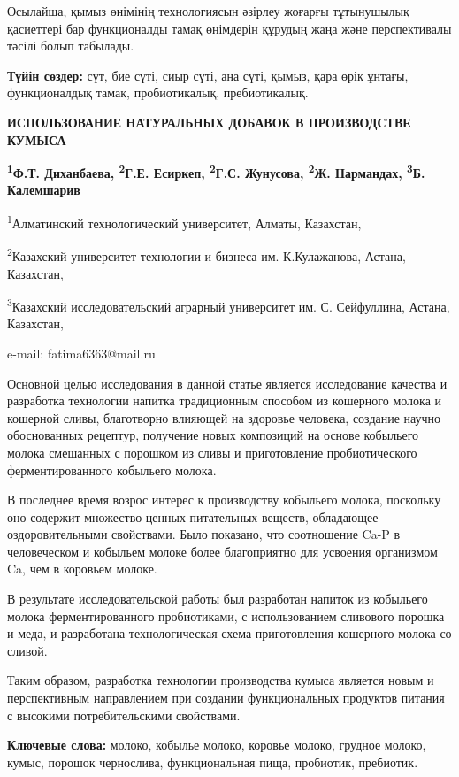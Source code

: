 Осылайша, қымыз өнімінің технологиясын әзірлеу жоғарғы тұтынушылық
қасиеттері бар функционалды тамақ өнімдерін құрудың жаңа және
перспективалы тәсілі болып табылады.

{\bfseries Түйін сөздер:} сүт, бие сүті, сиыр сүті, ана сүті, қымыз, қара
өрік ұнтағы, функционалдық тамақ, пробиотикалық, пребиотикалық.

\begin{center}
{\large\bfseries ИСПОЛЬЗОВАНИЕ НАТУРАЛЬНЫХ ДОБАВОК В ПРОИЗВОДСТВЕ КУМЫСА}

{\bfseries \textsuperscript{1}Ф.Т. Диханбаева, \textsuperscript{2}Г.Е. Есиркеп, \textsuperscript{2}Г.С. Жунусова, \textsuperscript{2}Ж. Нармандах, \textsuperscript{3}Б. Калемшарив}

\textsuperscript{1}Алматинский технологический университет, Алматы,
Казахстан,

\textsuperscript{2}Казахский университет технологии и бизнеса им.
К.Кулажанова, Астана, Казахстан,

\textsuperscript{3}Казахский исследовательский аграрный университет им.
С. Сейфуллина, Астана, Казахстан,

e-mail: fatima6363@mail.ru
\end{center}

Основной целью исследования в данной статье является исследование
качества и разработка технологии напитка традиционным способом из
кошерного молока и кошерной сливы, благотворно влияющей на здоровье
человека, создание научно обоснованных рецептур, получение новых
композиций на основе кобыльего молока смешанных с порошком из сливы и
приготовление пробиотического ферментированного кобыльего молока.

В последнее время возрос интерес к производству кобыльего молока,
поскольку оно содержит множество ценных питательных веществ, обладающее
оздоровительными свойствами. Было показано, что соотношение Ca-P в
человеческом и кобыльем молоке более благоприятно для усвоения
организмом Ca, чем в коровьем молоке.

В результате исследовательской работы был разработан напиток из
кобыльего молока ферментированного пробиотиками, с использованием
сливового порошка и меда, и разработана технологическая схема
приготовления кошерного молока со сливой.

Таким образом, разработка технологии производства кумыса является новым
и перспективным направлением при создании функциональных продуктов
питания с высокими потребительскими свойствами.

{\bfseries Ключевые слова:} молоко, кобылье молоко, коровье молоко, грудное
молоко, кумыс, порошок чернослива, функциональная пища, пробиотик,
пребиотик.

